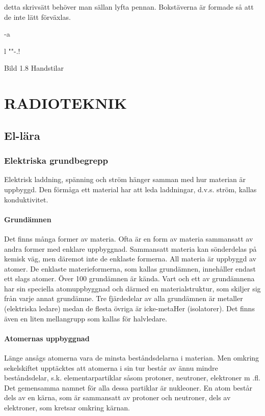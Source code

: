 \documentclass[a4paper,twoside,twocolumn,openright]{book}
\begin{document}
detta skrivsätt behöver man sällan lyfta pennan.
Bokstäverna är formade så att de inte lätt förväxlas.

-a

l
""-.!

Bild 1.8 Handstilar

\part{RADIOTEKNIK}

\chapter{El-lära}

\section{Elektriska grundbegrepp}

Elektrisk laddning, spänning och ström hänger samman med hur materian är uppbyggd.
Den förmåga ett material har att leda laddningar, d.v.s. ström, kallas konduktivitet.

\subsection{Grundämnen}

Det finns många former av materia. Ofta är en form av materia sammansatt av andra
former med enklare uppbyggnad.
Sammansatt materia kan sönderdelas på kemisk väg, men
däremot inte de enklaste formerna. All materia är uppbyggd av atomer. De enklaste
materieformerna, som kallas grundämnen, innehåller endast ett slags atomer. Över
100 grundämnen är kända.
Vart och ett av grundämnena har sin speciella atomuppbyggnad och därmed en
materialstruktur, som skiljer sig från varje annat grundämne.
Tre fjärdedelar av alla grundämnen är metaller (elektriska ledare) medan de flesta
övriga är icke-metaHer (isolatorer). Det finns även en liten mellangrupp som kallas för
halvledare.

\subsection{Atomernas uppbyggnad}

Länge ansågs atomerna vara de minsta
beståndsdelarna i materian. Men omkring
sekelskiftet upptäcktes att atomerna i sin tur
består av ännu mindre beståndsdelar, s.k.
elementarpartiklar såsom protoner, neutroner, elektroner m .fl. Det gemensamma namnet för alla dessa partiklar är nukleoner.
En atom består dels av en kärna, som är
sammansatt av protoner och neutroner, dels
av elektroner, som kretsar omkring kärnan.
\end{document}

